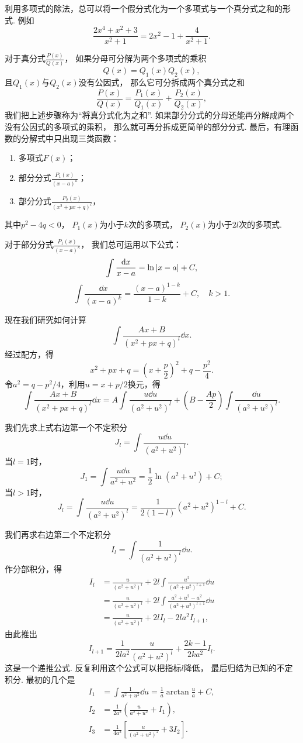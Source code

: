 利用多项式的除法，总可以将一个假分式化为一个多项式与一个真分式之和的形式.
例如\[
	\frac{2x^4+x^2+3}{x^2+1}
	= 2x^2-1+\frac{4}{x^2+1}.
\]

对于真分式\(\frac{P(x)}{Q(x)}\)，
如果分母可分解为两个多项式的乘积\[
	Q(x)=Q_1(x)Q_2(x),
\]
且\(Q_1(x)\)与\(Q_2(x)\)没有公因式，
那么它可分拆成两个真分式之和\[
	\frac{P(x)}{Q(x)} = \frac{P_1(x)}{Q_1(x)} + \frac{P_2(x)}{Q_2(x)},
\]
我们把上述步骤称为“将真分式化为之和”.
如果部分分式的分母还能再分解成两个没有公因式的多项式的乘积，
那么就可再分拆成更简单的部分分式.
最后，有理函数的分解式中只出现三类函数：
\begin{enumerate}
	\item 多项式\(F(x)\)；
	\item 部分分式\(\frac{P_1(x)}{(x-a)^k}\)；
	\item 部分分式\(\frac{P_2(x)}{(x^2+px+q)^l}\)，
\end{enumerate}
其中\(p^2-4q<0\)，
\(P_1(x)\)为小于\(k\)次的多项式，
\(P_2(x)\)为小于\(2l\)次的多项式.

对于部分分式\(\frac{P_1(x)}{(x-a)^k}\)，
我们总可运用以下公式：\[
	\int \frac{\dd{x}}{x-a} = \ln\abs{x-a} + C,
\]\[
	\int \frac{\dd{x}}{(x-a)^k} = \frac{(x-a)^{1-k}}{1-k} + C,
	\quad k>1.
\]

现在我们研究如何计算\[
	\int \frac{Ax+B}{(x^2+px+q)^l} \dd{x}.
\]
经过配方，得\[
	x^2+px+q = \left(x+\frac{p}{2}\right)^2 + q-\frac{p^2}{4}.
\]
令\(a^2=q-p^2/4\)，利用\(u=x+p/2\)换元，得\[
	\int \frac{Ax+B}{(x^2+px+q)^l} \dd{x}
	= A \int \frac{u \dd{u}}{(a^2+u^2)^l}
	+ \left(B - \frac{Ap}{2}\right) \int \frac{\dd{u}}{(a^2+u^2)^l}.
\]

我们先求上式右边第一个不定积分\[
	J_l = \int \frac{u \dd{u}}{(a^2+u^2)^l}.
\]
当\(l=1\)时，\[
	J_1
	= \int \frac{u \dd{u}}{a^2+u^2}
	= \frac{1}{2} \ln(a^2+u^2) + C;
\]
当\(l>1\)时，\[
	J_l
	= \int \frac{u \dd{u}}{(a^2+u^2)^l}
	= \frac{1}{2(1-l)} (a^2+u^2)^{1-l} + C.
\]

我们再求右边第二个不定积分\[
	I_l = \int \frac{1}{(a^2+u^2)^l} \dd{u}.
\]
作分部积分，得\begin{align*}
	I_l &= \frac{u}{(a^2+u^2)^l} + 2l \int \frac{u^2}{(a^2+u^2)^{l+1}} \dd{u} \\
	&= \frac{u}{(a^2+u^2)^l} + 2l \int \frac{a^2+u^2-a^2}{(a^2+u^2)^{l+1}} \dd{u} \\
	&= \frac{u}{(a^2+u^2)^l} + 2l I_l - 2la^2 I_{l+1},
\end{align*}
由此推出\[
	I_{l+1} = \frac{1}{2la^2} \frac{u}{(a^2+u^2)^l} + \frac{2k-1}{2ka^2} I_l.
\]
这是一个递推公式.
反复利用这个公式可以把指标\(l\)降低，
最后归结为已知的不定积分.
最初的几个是\begin{align*}
	I_1 &= \int \frac{1}{a^2+u^2} \dd{u} = \frac{1}{a} \arctan\frac{u}{a} + C, \\
	I_2 &= \frac{1}{2a^2} \left( \frac{u}{a^2+u^2} + I_1 \right), \\
	I_3 &= \frac{1}{4a^2} \left[ \frac{u}{(a^2+u^2)^2} + 3 I_2 \right].
\end{align*}

